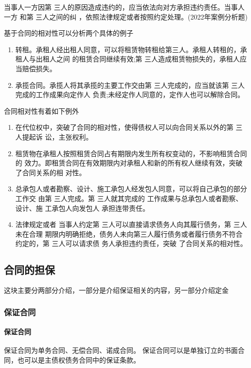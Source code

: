 \documentclass[UTF8,12pt]{ctexart}
\numberwithin{equation}{section} %
\numberwithin{figure}{section}
\numberwithin{table}{section}
\begin{document}
	当事人一方因第 三人的原因造成违约的，应当依法向对方承担违约责任。当事人一方 和第 三人之间的纠 ，依照法律规定或者按照约定处理。(2022年案例分析题)
	
	基于合同的相对性可以分析两个具体的例子
	\begin{enumerate}
		\item 转租。承租人经出租人同意，可以将租赁物转租给第三人。承租人转租的，承租人与出租人之间 的租赁合同继续有效;第 三人造成租赁物损失的，承租人应当赔偿损失。
		
		\item 承揽合同。承揽人将其承揽的主要工作交由第 三人完成的，应当就该第 三人完成的工作成果向定作人 负责;未经定作人同意的，定作人也可以解除合同。
	\end{enumerate}
	
	合同相对性有着如下例外
	\begin{enumerate}
		\item 在代位权中，突破了合同的相对性，使得债权人可以向合同关系以外的第 三人提起诉 讼，主张权利。 
		
		\item 租赁物在承租人按照租赁合同占有期限内发生所有权变动的，不影响租赁合同的 效力。即租赁合同在有效期限内对承租人和新的所有权人继续有效，突破了合同关系的相 对性。 
		
		\item 总承包人或者勘察、设计、施工承包人经发包人同意，可以将自己承包的部分工作交 由第 三人完成。第 三人就其完成的 工作成果与总承包人或者勘察、设计、施 工承包人向发包人 承担连带责任。
		
		\item 法律规定或者 当事人约定第 三人可以直接请求债务人向其履行债务，第 三人未在合理 期限内明确拒绝，债务人未向第三人履行债务或者履行债务不符合约定的，第 三人可以请求债 务人承担违约责任，突破 了合同关系的相对性。
	\end{enumerate} 
	
	\subsection{合同的担保}
	这块主要分两部分介绍，一部分是介绍保证相关的内容，另一部分介绍定金
	
	\subsubsection{保证合同}
	\paragraph{保证合同}
	保证合同为单务合同、无偿合同、诺成合同。 保证合同可以是单独订立的书面合同，也可以是主债权债务合同中的保证条款。 
	
\end{document}
